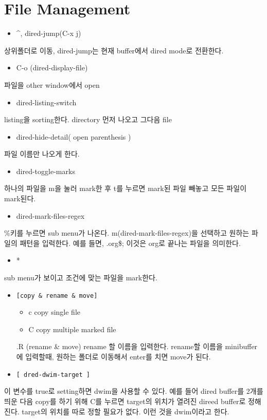 \documentclass[11pt]{article}
\begin{document}
\section*{File Management}
\label{sec:org6834854}
\begin{itemize}
\item \^{}, dired-jump(C-x j)
\end{itemize}
상위폴더로 이동, dired-jump는 현재 buffer에서 dired mode로 전환한다.
\begin{itemize}
\item C-o (dired-display-file)
\end{itemize}
파일을 other window에서 open
\begin{itemize}
\item dired-listing-switch
\end{itemize}
listing을 sorting한다. directory 먼저 나오고 그다음 file
\begin{itemize}
\item dired-hide-detail( open parenthesis )
\end{itemize}
파일 이름만 나오게 한다.
\begin{itemize}
\item dired-toggle-marks
\end{itemize}
하나의 파일을 m을 눌러 mark한 후 t를 누르면 mark된 파일 빼놓고 모든 파일이 mark된다.
\begin{itemize}
\item dired-mark-files-regex
\end{itemize}
\%키를 누르면 sub menu가 나온다. m(dired-mark-files-regex)을 선택하고 원하는 파일의 패턴을 입럭한다. 
예를 들면, .org\$; 이것은 org로 끝나는 파일을 의미한다.
\begin{itemize}
\item *
\end{itemize}
sub menu가 보이고 조건에  맞는 파일을 mark한다.
\begin{itemize}
\item \texttt{[copy \& rename \& move]}
\begin{itemize}
\item c 
copy single file
\item C
copy multiple marked file
\end{itemize}
.R (rename \& move)
 rename 할 이름을 입력한다.
 rename할 이름을 minibuffer에 입력할때, 원하는 폴더로 이동해서 enter를 치면 move가 된다.

\item \texttt{[ dred-dwim-target ]}
\end{itemize}
이 변수를 true로 setting하면 dwim을 사용할 수 있다. 예를 들어 dired buffer를 2개를 띄운 다음 copy를 하기 위해 C를 누르면 target의 위치가 열려진 direed buffer로 정해진다. target의 위치를 따로 정할 필요가 없다. 이런 것을 dwim이라고 한다. 
\end{document}
